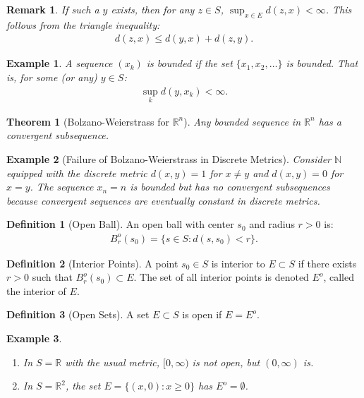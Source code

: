 \documentclass[7pt]{article}
\theoremstyle{definition}
\newtheorem{definition}{Definition}
\theoremstyle{plain}
\newtheorem{theorem}{Theorem}
\newtheorem{example}{Example}
\newtheorem{remark}{Remark}
\begin{document}
\begin{remark}
If such a $ y $ exists, then for any $ z \in S $, $ \sup_{x \in E} d(z, x) < \infty $. This follows from the triangle inequality:
\begin{align}
d(z, x) \leq d(y, x) + d(z, y).
\end{align}
\end{remark}

\begin{example}
A sequence $ (x_k) $ is bounded if the set $ \{x_1, x_2, \ldots\} $ is bounded. That is, for some (or any) $ y \in S $:
\begin{align}
\sup_k d(y, x_k) < \infty.
\end{align}
\end{example}

\begin{theorem}[Bolzano-Weierstrass for $ \mathbb{R}^n $]
Any bounded sequence in $ \mathbb{R}^n $ has a convergent subsequence.
\end{theorem}

\begin{example}[Failure of Bolzano-Weierstrass in Discrete Metrics]
Consider $ \mathbb{N} $ equipped with the discrete metric $ d(x, y) = 1 $ for $ x \neq y $ and $ d(x, y) = 0 $ for $ x = y $. The sequence $ x_n = n $ is bounded but has no convergent subsequences because convergent sequences are eventually constant in discrete metrics.
\end{example}

\begin{definition}[Open Ball]
An open ball with center $ s_0 $ and radius $ r > 0 $ is:
\begin{align}
B_r^o(s_0) = \{s \in S : d(s, s_0) < r\}.
\end{align}
\end{definition}

\begin{definition}[Interior Points]
A point $ s_0 \in S $ is interior to $ E \subset S $ if there exists $ r > 0 $ such that $ B_r^o(s_0) \subset E $. The set of all interior points is denoted $ E^o $, called the interior of $ E $.
\end{definition}

\begin{definition}[Open Sets]
A set $ E \subset S $ is open if $ E = E^o $.
\end{definition}

\begin{example}

\begin{enumerate}
    \item In $ S = \mathbb{R} $ with the usual metric, $ [0, \infty) $ is not open, but $ (0, \infty) $ is.
    \item In $ S = \mathbb{R}^2 $, the set $ E = \{(x, 0) : x \geq 0\} $ has $ E^o = \emptyset $.
\end{enumerate}
\end{example}
\end{document}
